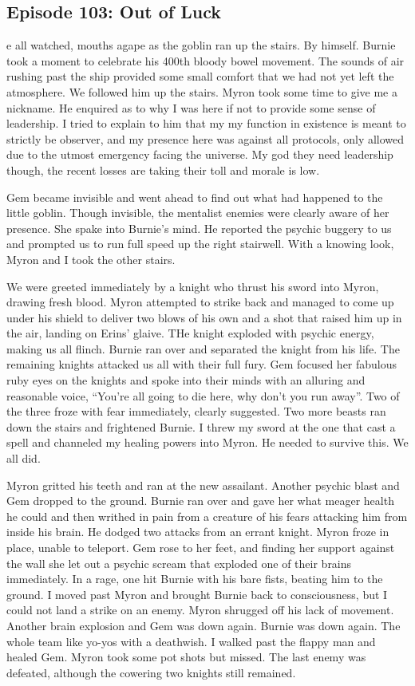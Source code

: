 \subsection{Episode 103: Out of Luck}

e all watched, mouths agape as the goblin ran up the stairs. By himself. Burnie took a moment to celebrate his 400th bloody bowel movement. The sounds of air rushing past the ship provided some small comfort that we had not yet left the atmosphere. We followed him up the stairs. Myron took some time to give me a nickname. He enquired as to why I was here if not to provide some sense of leadership. I tried to explain to him that my my function in existence is meant to strictly be observer, and my presence here was against all protocols, only allowed due to the utmost emergency facing the universe. My god they need leadership though, the recent losses are taking their toll and morale is low.\medskip

Gem became invisible and went ahead to find out what had happened to the little goblin. Though invisible, the mentalist enemies were clearly aware of her presence. She spake into Burnie’s mind. He reported the psychic buggery to us and prompted us to run full speed up the right stairwell. With a knowing look, Myron and I took the other stairs.\medskip

We were greeted immediately by a knight who thrust his sword into Myron, drawing fresh blood. Myron attempted to strike back and managed to come up under his shield to deliver two blows of his own and a shot that raised him up in the air, landing on Erins’ glaive. THe knight exploded with psychic energy, making us all flinch. Burnie ran over and separated the knight from his life. The remaining knights attacked us all with their full fury. Gem focused her fabulous ruby eyes on the knights and spoke into their minds with an alluring and reasonable voice, “You’re all going to die here, why don’t you run away”. Two of the three froze with fear immediately, clearly suggested. Two more beasts ran down the stairs and frightened Burnie. I threw my sword at the one that cast a spell and channeled my healing powers into Myron. He needed to survive this. We all did.\medskip

Myron gritted his teeth and ran at the new assailant. Another psychic blast and Gem dropped to the ground. Burnie ran over and gave her what meager health he could and then writhed in pain from a creature of his fears attacking him from inside his brain. He dodged two attacks from an errant knight. Myron froze in place, unable to teleport. Gem rose to her feet, and finding her support against the wall she let out a psychic scream that exploded one of their brains immediately. In a rage, one hit Burnie with his bare fists, beating him to the ground. I moved past Myron and brought Burnie back to consciousness, but I could not land a strike on an enemy. Myron shrugged off his lack of movement. Another brain explosion and Gem was down again. Burnie was down again. The whole team like yo-yos with a deathwish. I walked past the flappy man and healed Gem. Myron took some pot shots but missed. The last enemy was defeated, although the cowering two knights still remained.\medskip

